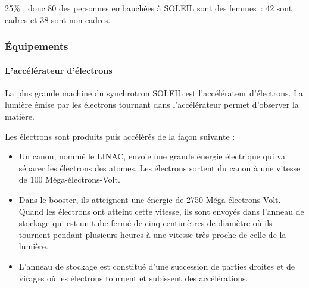 				25\% , donc 80 des personnes embauchées à SOLEIL sont des femmes~: 42 sont cadres et 38 sont non cadres.


		\subsubsection{Équipements}
			
			\paragraph{L'accélérateur d'électrons}
				La plus grande machine du synchrotron SOLEIL est l'accélérateur d'électrons. La lumière émise par les électrons tournant dans l'accélérateur permet d'observer la matière. 
				
				Les électrons sont produits puis accélérés de la façon suivante : 
				\begin{itemize}
					\item Un canon, nommé le LINAC, envoie une grande énergie électrique qui va séparer les électrons des atomes. Les électrons sortent du canon à une vitesse de 100 Méga-électrons-Volt.  
					\item Dans le booster, ils atteignent une énergie de 2750 Méga-électrons-Volt. Quand les électrons ont atteint cette vitesse, ils sont envoyés dans l'anneau de stockage qui est un tube fermé de cinq centimètres de diamètre où ils tournent pendant plusieurs heures à une vitesse très proche de celle de la lumière. 

					\item L'anneau de stockage est constitué d'une succession de parties droites et de virages où les électrons tournent et subissent des accélérations. 
				\end{itemize}


